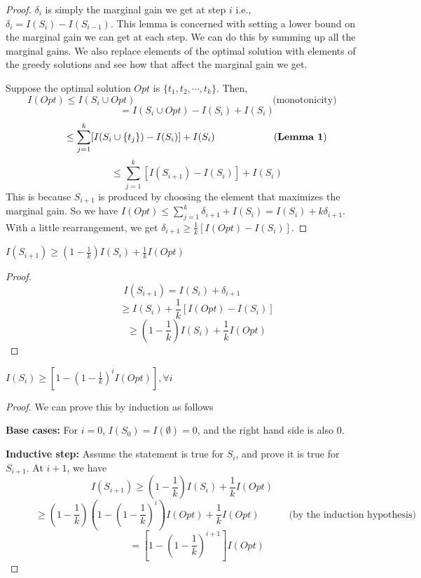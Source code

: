 \begin{proof}
$\delta_{i}$ is simply the marginal gain we get at step $i$ i.e., $\delta_{i}=I(S_{i})-I(S_{i-1})$. This lemma is concerned with setting a lower bound on the marginal gain we can get at each step. We can do this by summing up all the marginal gains. We also replace elements of the optimal solution with elements of the greedy solutions and see how that affect the marginal gain we get. 


\noindent
Suppose the optimal solution $Opt$ is $\{t_{1}, t_{2},\cdots,t_{k}\}$. Then, 
\mathleft
\[
I(Opt)\leq I(S_{i}\cup Opt) \qquad \qquad \qquad \qquad \qquad \qquad  \qquad \text{(monotonicity)}
\]
\[
\qquad\quad  = I(S_{i}\cup Opt) - I(S_{i}) + I(S_{i})
\]
\[
\qquad\quad  \leq \sum_{j=1}^{k}[I(S_{i}\cup \{t_{j}\})-I(S_{i})] + I(S_{i}) \qquad \qquad \qquad \text{(\textbf{Lemma 1})}
\]
\[
\qquad\quad \leq \sum_{j=1}^{k}[I(S_{i+1})-I(S_{i})] + I(S_{i})
\]
This is because $S_{i+1}$ is produced by choosing the element that maximizes the marginal gain. So we have $I(Opt)\leq \sum_{j=1}^{k}\delta_{i+1}+I(S_{i})=I(S_{i})+k\delta_{i+1}$. With a little rearrangement, we get $\delta_{i+1}\geq \frac{1}{k}[I(Opt)-I(S_{i})]$.
\end{proof}



\begin{lemma}
$I(S_{i+1})\geq(1-\frac{1}{k})I(S_{i})+\frac{1}{k}I(Opt)$
\end{lemma}

\begin{proof}
\mathleft
\[I(S_{i+1}) = I(S_{i})+\delta_{i+1}\]
\[\qquad\quad \geq I(S_{i})+\frac{1}{k}[I(Opt)-I(S_{i})] \]
\[\qquad\quad \geq \left(1-\frac{1}{k} \right)I(S_{i})+\frac{1}{k}I(Opt)\]
\end{proof}


\begin{lemma}
$I(S_{i})\geq[1-(1-\frac{1}{k})^{i}I(Opt)], \forall i$
\end{lemma}

\begin{proof}
We can prove this by induction as follows 



\noindent
\textbf{Base cases:} For $i=0$, $I(S_{0})=I(\emptyset)=0$, and the right hand side is also 0.


\noindent
\textbf{Inductive step:} Assume the statement is true for $S_{i}$, and prove it is true for $S_{i+1}$. At $i+1$, we have 
\mathleft
\[
I(S_{i+1}) \geq \left(1-\frac{1}{k} \right) I(S_{i})+ \frac{1}{k}I(Opt)
\]
\[
\qquad\quad \geq \left(1-\frac{1}{k}\right) \left(1- \left(1-\frac{1}{k}\right)^{i} \right)I(Opt) + \frac{1}{k}I(Opt) \quad \qquad \text{(by the induction hypothesis)}
\]
\[
\qquad \quad = [1-\left(1-\frac{1}{k} \right)^{i+1}]I(Opt)
\]
\end{proof}


